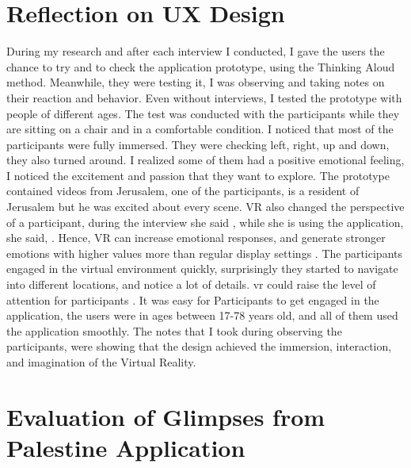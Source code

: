 \section{Reflection on UX Design}

During my research and after each interview I conducted, I gave the users the chance to try and to check the application prototype, using the Thinking Aloud method. Meanwhile, they were testing it, I was observing and taking notes on their reaction and behavior. Even without interviews, I tested the prototype with people of different ages. The test was conducted with the participants while they are sitting on a chair and in a comfortable condition. 
I noticed that most of the participants were fully immersed. They were checking left, right, up and down, they also turned around. I realized some of them had a positive emotional feeling, I noticed the excitement and passion that they want to explore. The prototype contained videos from Jerusalem, one of the participants, is a resident of Jerusalem but he was excited about every scene. VR also changed the perspective of a participant, during the interview she said , while she is using the application, she said, . Hence, VR can increase emotional responses, and generate stronger emotions with higher values more than regular display settings \citep{Estupinan2014CanStudy}. The participants engaged in the virtual environment quickly, surprisingly they started to navigate into different locations, and notice a lot of details. \acrshort{vr} could raise the level of attention for participants \citep{Estupinan2014CanStudy}. It was easy for Participants to get engaged in the application, the users were in ages between 17-78 years old, and all of them used the application smoothly. The notes that I took during observing the participants, were showing that the design achieved the immersion, interaction, and imagination of the Virtual Reality. 
 

\section{Evaluation of Glimpses from Palestine Application}

